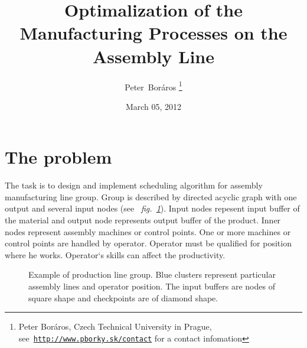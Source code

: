 \documentclass[a4paper,journal,twocolumn]{IEEEtran}
\begin{document}
\title{Optimalization of the Manufacturing Processes on the Assembly Line}
\date{March 05, 2012}
\author{Peter~Boráros %
\thanks{{Peter Boráros}, Czech Technical University in Prague,
see~\href{http://www.pborky.sk/contact}{\scriptsize{\texttt{http://www.pborky.sk/contact}}} for a contact infomation}}%




\maketitle
\IEEEdisplaynotcompsoctitleabstractindextext
\IEEEpeerreviewmaketitle

\section{The problem}\label{ass}
The task is to design and implement scheduling algorithm for assembly manufacturing line group.
Group is described by directed acyclic graph with one output and several input nodes (see
~\emph{fig.~\ref{fig:graph}}). Input nodes repesent input buffer of the material and output node represents
output buffer of the product. Inner nodes represent assembly machines or control points.
One or more machines or control points are handled by operator. Operator must be qualified for 
position where he works. Operator`s skills can affect the productivity.

\begin{figure}[h]%
  \centering
  \caption{Example of production line group. Blue clusters represent particular assembly lines
  and operator position. 
  The input buffers are nodes of square shape and checkpoints are of diamond shape.}
  \label{fig:graph}
\end{figure}
\end{document}
